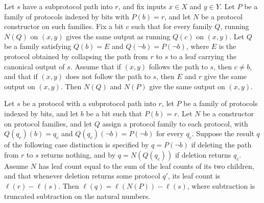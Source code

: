 \begin{lemma}
\label{CommunicationComplexity.Deterministic.Protocol.erasePath_run_outside_branch}
\leanok
{}
Let $s$ have a subprotocol path into $r$, and fix inputs $x\in X$ and $y\in Y$. Let $P$
be a family of protocols indexed by bits with $P(b)=r$, and let $N$ be a protocol
constructor on such families. Fix a bit $c$ such that for every family $Q$, running
$N(Q)$ on $(x,y)$ gives the same output as running $Q(c)$ on $(x,y)$. Let $Q$ be a
family satisfying $Q(b)=E$ and $Q(\neg b)=P(\neg b)$, where $E$ is the protocol obtained
by collapsing the path from $r$ to $s$ to a leaf carrying the canonical output of $s$.
Assume that if $(x,y)$ follows the path to $s$, then $c\ne b$, and that if $(x,y)$ does
not follow the path to $s$, then $E$ and $r$ give the same output on $(x,y)$. Then
$N(Q)$ and $N(P)$ give the same output on $(x,y)$.
\end{lemma}

\begin{lemma}
\label{CommunicationComplexity.Deterministic.Protocol.deletePath_numLeaves_branch}
\leanok
{}
Let $s$ be a protocol with a subprotocol path into $r$, let $P$ be a family of protocols
indexed by bits, and let $b$ be a bit such that $P(b)=r$. Let $N$ be a constructor on
protocol families, and let $Q$ assign a protocol family to each protocol, with
$Q(q_c)(b)=q_c$ and $Q(q_c)(\neg b)=P(\neg b)$ for every $q_c$. Suppose the result $q$
of the following case distinction is specified by $q=P(\neg b)$ if deleting the path
from $r$ to $s$ returns nothing, and by $q=N(Q(q_c))$ if deletion returns $q_c$. Assume
$N$ has leaf count equal to the sum of the leaf counts of its two children, and that
whenever deletion returns some protocol $q'$, its leaf count is $\ell(r)-\ell(s)$. Then
$\ell(q)=\ell(N(P))-\ell(s)$, where subtraction is truncated subtraction on the natural
numbers.
\end{lemma}

